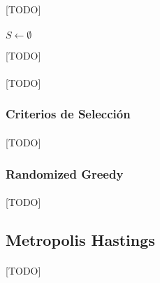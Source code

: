 \documentclass{subfiles}
\begin{document}
        \paragraph{}
        [TODO]


        \paragraph{}
        \begin{algorithm}
          \SetAlgoLined
          $S \gets \emptyset$\;
          \caption{[TODO]}
          \label{code:solving_greedy}
        \end{algorithm}


        \paragraph{}
        [TODO]

        \subsubsection{Criterios de Selección}
        \label{sec:solving_greedy_criterions}

          \paragraph{}
          [TODO]

        \subsubsection{Randomized Greedy}
        \label{sec:solving_randomized_greedy}

          \paragraph{}
          [TODO]

      \subsection{Metropolis Hastings}
      \label{sec:solving_metropolis}

        \paragraph{}
        [TODO]
\end{document}
